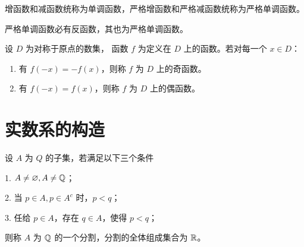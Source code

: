 增函数和减函数统称为单调函数，严格增函数和严格减函数统称为严格单调函数。

严格单调函数必有反函数，其也为严格单调函数。

\begin{definition}
	设 $D$ 为对称于原点的数集， 函数 $f$ 为定义在 $D$ 上的函数。若对每一个 $x\in D$：
	\begin{enumerate}
		\item 有 $f(-x) = -f(x)$，则称 $f$ 为 $D$ 上的奇函数。
		\item 有 $f(-x) = f(x)$，则称 $f$ 为 $D$ 上的偶函数。
	\end{enumerate}
\end{definition}

\section{实数系的构造}

\begin{definition}[Dedekind 分割]
	设 $A$ 为 $Q$ 的子集，若满足以下三个条件

	1. $A \ne \varnothing,A \ne \mathbb{Q}$；

	2. 当 $p\in A,p \in A^c$ 时，$p<q$；

	3. 任给 $p \in A$，存在 $q \in A$，使得 $p<q$；

	则称 $A$ 为 $\mathbb{Q}$ 的一个分割，分割的全体组成集合为 $\mathbb{R}$。
\end{definition}

